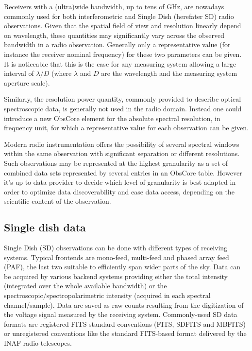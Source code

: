 \documentclass[11pt,a4paper]{ivoa}
\begin{document}
Receivers with a (ultra)wide bandwidth, up to tens of GHz, are
nowadays commonly used for both interferometric and Single Dish (herefater SD) radio observations.
Given that the spatial field of view and resolution linearly depend on wavelength, these quantities may significantly vary across the observed bandwidth in a radio observation.
Generally only a representative value (for instance the
receiver nominal frequency) for these two parameters can be given. It is
noticeable that this is the case for any measuring system allowing a large interval of
$\lambda/D$ (where $\lambda$ and $D$ are the wavelength and the measuring system
aperture scale).
 
Similarly, the resolution power quantity, commonly provided to describe optical spectroscopic data, is generally not used in the radio domain.
Instead one could introduce a new ObsCore element for the absolute spectral resolution, in frequency unit, for which a representative value for each observation can be given.

Modern radio instrumentation offers the possibility of several  spectral windows within the same observation with significant separation or different resolutions.
Such observations may be represented at the highest granularity as  a set of combined data sets represented by several entries in an ObsCore table. However it's up to data provider to decide which level of granularity is best adapted in order to optimize data discoverability and ease data access, depending on the scientific content of the observation.



\subsection{Single dish data}\label{subsec:sd}

Single Dish (SD) observations can be done with different types of receiving systems. Typical frontends are mono-feed, multi-feed and phased array feed (PAF), the last two suitable to efficiently span wider parts of the sky.
Data can be acquired by various backend systems providing either the total intensity (integrated over the whole available bandwidth) or the spectroscopic/spectropolarimetric intensity (acquired in each spectral channel/sample).
Data are saved as raw counts resulting from the digitization of the voltage signal measured by the receiving system.
Commonly-used SD data formats are registered FITS standard conventions (FITS, SDFITS and MBFITS) or unregistered conventions like the standard FITS-based format delivered by the INAF radio telescopes.
\end{document}
